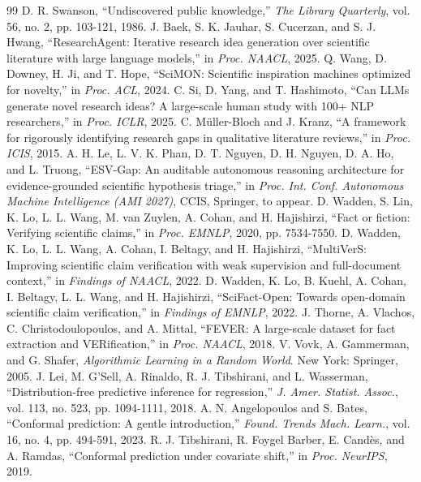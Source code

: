 \documentclass[conference,a4paper]{IEEEtran}
\theoremstyle{definition}
\begin{document}
\begin{thebibliography}{99}
 D. R. Swanson, ``Undiscovered public knowledge,'' \emph{The Library Quarterly}, vol. 56, no. 2, pp. 103-121, 1986.
 J. Baek, S. K. Jauhar, S. Cucerzan, and S. J. Hwang, ``ResearchAgent: Iterative research idea generation over scientific literature with large language models,'' in \emph{Proc. NAACL}, 2025.
 Q. Wang, D. Downey, H. Ji, and T. Hope, ``SciMON: Scientific inspiration machines optimized for novelty,'' in \emph{Proc. ACL}, 2024.
 C. Si, D. Yang, and T. Hashimoto, ``Can LLMs generate novel research ideas? A large-scale human study with 100+ NLP researchers,'' in \emph{Proc. ICLR}, 2025.
 C. M\"uller-Bloch and J. Kranz, ``A framework for rigorously identifying research gaps in qualitative literature reviews,'' in \emph{Proc. ICIS}, 2015.
 A. H. Le, L. V. K. Phan, D. T. Nguyen, D. H. Nguyen, D. A. Ho, and L. Truong, ``ESV-Gap: An auditable autonomous reasoning architecture for evidence-grounded scientific hypothesis triage,'' in \emph{Proc. Int. Conf. Autonomous Machine Intelligence (AMI 2027)}, CCIS, Springer, to appear.
 D. Wadden, S. Lin, K. Lo, L. L. Wang, M. van Zuylen, A. Cohan, and H. Hajishirzi, ``Fact or fiction: Verifying scientific claims,'' in \emph{Proc. EMNLP}, 2020, pp. 7534-7550.
 D. Wadden, K. Lo, L. L. Wang, A. Cohan, I. Beltagy, and H. Hajishirzi, ``MultiVerS: Improving scientific claim verification with weak supervision and full-document context,'' in \emph{Findings of NAACL}, 2022.
 D. Wadden, K. Lo, B. Kuehl, A. Cohan, I. Beltagy, L. L. Wang, and H. Hajishirzi, ``SciFact-Open: Towards open-domain scientific claim verification,'' in \emph{Findings of EMNLP}, 2022.
 J. Thorne, A. Vlachos, C. Christodoulopoulos, and A. Mittal, ``FEVER: A large-scale dataset for fact extraction and VERification,'' in \emph{Proc. NAACL}, 2018.
 V. Vovk, A. Gammerman, and G. Shafer, \emph{Algorithmic Learning in a Random World}. New York: Springer, 2005.
 J. Lei, M. G'Sell, A. Rinaldo, R. J. Tibshirani, and L. Wasserman, ``Distribution-free predictive inference for regression,'' \emph{J. Amer. Statist. Assoc.}, vol. 113, no. 523, pp. 1094-1111, 2018.
 A. N. Angelopoulos and S. Bates, ``Conformal prediction: A gentle introduction,'' \emph{Found. Trends Mach. Learn.}, vol. 16, no. 4, pp. 494-591, 2023.
 R. J. Tibshirani, R. Foygel Barber, E. Cand\`es, and A. Ramdas, ``Conformal prediction under covariate shift,'' in \emph{Proc. NeurIPS}, 2019.

\end{thebibliography}
\end{document}
